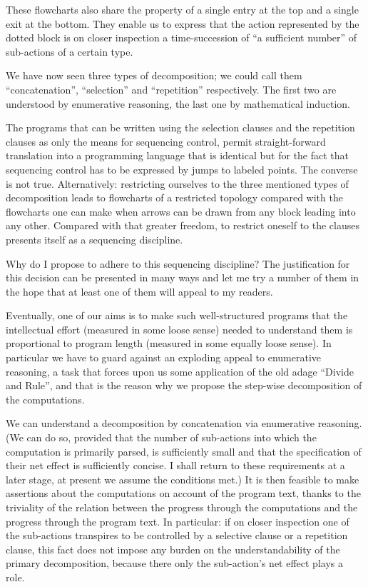 These flowcharts also share the property of a single entry at the top and a single exit at the bottom. They enable us to express that the action represented by the dotted block is on closer inspection a time-succession of ``a sufficient number'' of sub-actions of a certain type.

We have now seen three types of decomposition; we could call them ``concatenation'', ``selection'' and ``repetition'' respectively. The first two are understood by enumerative reasoning, the last one by mathematical induction. 

The programs that can be written using the selection clauses and the repetition clauses as only the means for sequencing control, permit straight-forward translation into a programming language that is identical but for the fact that sequencing control has to be expressed by jumps to labeled points. The converse is not true. Alternatively: restricting ourselves to the three mentioned types of decomposition leads to flowcharts of a restricted topology compared with the flowcharts one can make when arrows can be drawn from any block leading into any other. Compared with that greater freedom, to restrict oneself to the clauses presents itself as a sequencing discipline.

Why do I propose to adhere to this sequencing discipline? The justification for this decision can be presented in many ways and let me try a number of them in the hope that at least one of them will appeal to my readers.

Eventually, one of our aims is to make such well-structured programs that the intellectual effort (measured in some loose sense) needed to understand them is proportional to program length (measured in some equally loose sense). In particular we have to guard against an exploding appeal to enumerative reasoning, a task that forces upon us some application of the old adage ``Divide and Rule'', and that is the reason why we propose the step-wise decomposition of the computations.

We can understand a decomposition by concatenation via enumerative reasoning. (We can do so, provided that the number of sub-actions into which the computation is primarily parsed, is sufficiently small and that the specification of their net effect is sufficiently concise. I shall return to these requirements at a later stage, at present we assume the conditions met.) It is then feasible to make assertions about the computations on account of the program text, thanks to the triviality of the relation between the progress through the computations and the progress through the program text. In particular: if on closer inspection one of the sub-actions transpires to be controlled by a selective clause or a repetition clause, this fact does not impose any burden on the understandability of the primary decomposition, because there only the sub-action's net effect plays a role.

